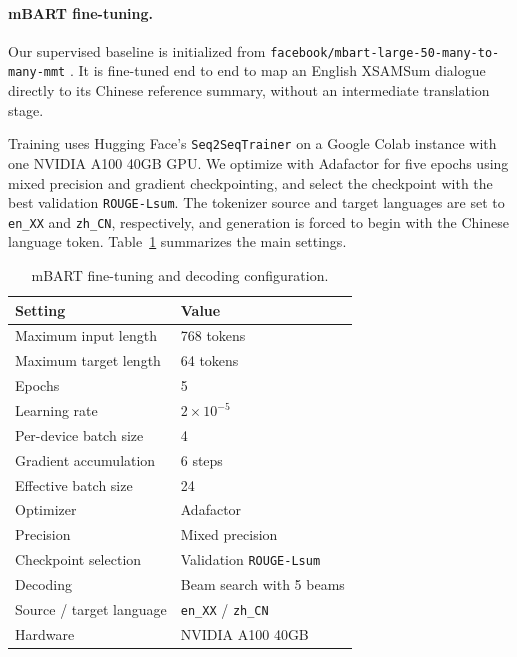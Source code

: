 \documentclass[11pt]{article}
\begin{document}
\paragraph{mBART fine-tuning.}

Our supervised baseline is initialized from \texttt{facebook/mbart-large-50-many-to-many-mmt} \citep{liu-etal-2020-multilingual-denoising,tang-etal-2021-multilingual}. It is fine-tuned end to end to map an English XSAMSum dialogue directly to its Chinese reference summary, without an intermediate translation stage.

Training uses Hugging Face's \texttt{Seq2SeqTrainer} on a Google Colab instance with one NVIDIA A100 40GB GPU. We optimize with Adafactor for five epochs using mixed precision and gradient checkpointing, and select the checkpoint with the best validation \texttt{ROUGE-Lsum}. The tokenizer source and target languages are set to \texttt{en\_XX} and \texttt{zh\_CN}, respectively, and generation is forced to begin with the Chinese language token. Table~\ref{tab:mbart-training} summarizes the main settings.

\begin{table}[H]
\centering
\footnotesize
\setlength{\tabcolsep}{4pt}
\begin{tabularx}{\columnwidth}{@{}lX@{}}
\hline
Setting & Value \\
\hline
Maximum input length & 768 tokens \\
Maximum target length & 64 tokens \\
Epochs & 5 \\
Learning rate & $2\times10^{-5}$ \\
Per-device batch size & 4 \\
Gradient accumulation & 6 steps \\
Effective batch size & 24 \\
Optimizer & Adafactor \\
Precision & Mixed precision \\
Checkpoint selection & Validation \texttt{ROUGE-Lsum} \\
Decoding & Beam search with 5 beams \\
Source / target language & \texttt{en\_XX} / \texttt{zh\_CN} \\
Hardware & NVIDIA A100 40GB \\
\hline
\end{tabularx}
\caption{mBART fine-tuning and decoding configuration.}
\label{tab:mbart-training}
\end{table}
\end{document}
